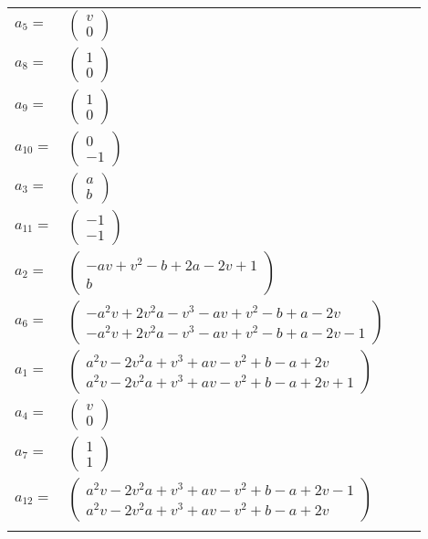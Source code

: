 \documentclass[1p]{elsarticle_modified}
\theoremstyle{definition}
\begin{document}
\begin{tabular}{m{7pt} m{180pt} m{7pt} m{180pt} }
\flushright $a_{5}=$&$\begin{pmatrix}v\\0\end{pmatrix}$ \\
\flushright $a_{8}=$&$\begin{pmatrix}1\\0\end{pmatrix}$ \\
\flushright $a_{9}=$&$\begin{pmatrix}1\\0\end{pmatrix}$ \\
\flushright $a_{10}=$&$\begin{pmatrix}0\\-1\end{pmatrix}$ \\
\flushright $a_{3}=$&$\begin{pmatrix}a\\b\end{pmatrix}$ \\
\flushright $a_{11}=$&$\begin{pmatrix}-1\\-1\end{pmatrix}$ \\
\flushright $a_{2}=$&$\begin{pmatrix}- a v+v^2- b+2 a-2 v+1\\b\end{pmatrix}$ \\
\flushright $a_{6}=$&$\begin{pmatrix}- a^2 v+2 v^2 a- v^3- a v+v^2- b+a-2 v\\- a^2 v+2 v^2 a- v^3- a v+v^2- b+a-2 v-1\end{pmatrix}$ \\
\flushright $a_{1}=$&$\begin{pmatrix}a^2 v-2 v^2 a+v^3+a v- v^2+b- a+2 v\\a^2 v-2 v^2 a+v^3+a v- v^2+b- a+2 v+1\end{pmatrix}$ \\
\flushright $a_{4}=$&$\begin{pmatrix}v\\0\end{pmatrix}$ \\
\flushright $a_{7}=$&$\begin{pmatrix}1\\1\end{pmatrix}$ \\
\flushright $a_{12}=$&$\begin{pmatrix}a^2 v-2 v^2 a+v^3+a v- v^2+b- a+2 v-1\\a^2 v-2 v^2 a+v^3+a v- v^2+b- a+2 v\end{pmatrix}$\\&\end{tabular}
\end{document}
